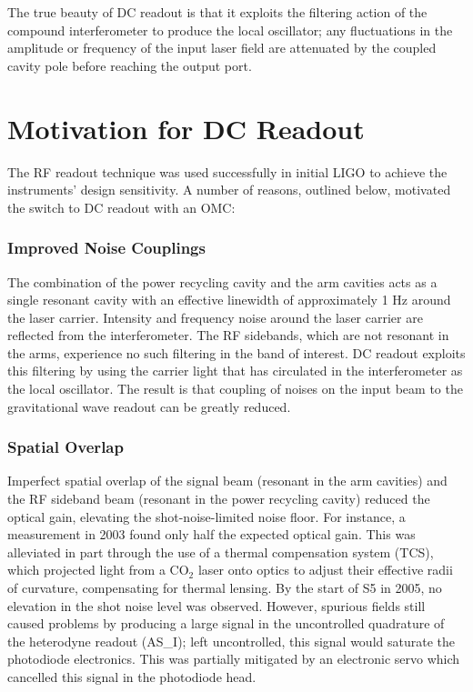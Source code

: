The true beauty of DC readout is that it exploits the filtering
action of the compound interferometer to produce the local oscillator;
any fluctuations in the amplitude or frequency of the input laser
field are attenuated by the coupled cavity pole before reaching the
output port.

\section{Motivation for DC Readout}

The RF readout technique was used successfully in initial LIGO to
achieve the instruments' design sensitivity.  A number of reasons,
outlined below, motivated the switch to DC readout with an OMC:

\subsubsection*{Improved Noise Couplings} 
The combination of the power recycling cavity and the arm cavities
acts as a single resonant cavity with an effective linewidth of
approximately 1 Hz around the laser carrier.  Intensity and frequency
noise around the laser carrier are reflected from the
interferometer.  The RF sidebands, which are not resonant in the arms,
experience no such filtering in the band of interest.  DC readout
exploits this filtering by using the carrier light that has circulated
in the interferometer as the local oscillator.  The result is that
coupling of noises on the input beam to the gravitational wave readout
can be greatly reduced.

\subsubsection*{Spatial Overlap}  
Imperfect spatial overlap of the signal beam (resonant in the arm
cavities) and the RF sideband beam (resonant in the power recycling
cavity) reduced the optical gain, elevating the shot-noise-limited
noise floor. For instance, a measurement in 2003 found only half the
expected optical gain\cite{Fritschel2003Shot}.  This was alleviated in
part through the use of a thermal compensation system (TCS), which
projected light from a CO$_2$ laser onto optics to adjust their
effective radii of curvature, compensating for thermal lensing.  By
the start of S5 in 2005, no elevation in the shot noise level was
observed\cite{Ballmer2006LIGO}.  However, spurious fields still caused
problems by producing a large signal in the uncontrolled quadrature of
the heterodyne readout (AS\_I); left uncontrolled, this signal would
saturate the photodiode electronics.  This was partially mitigated by
an electronic servo which cancelled this signal in the photodiode
head.

